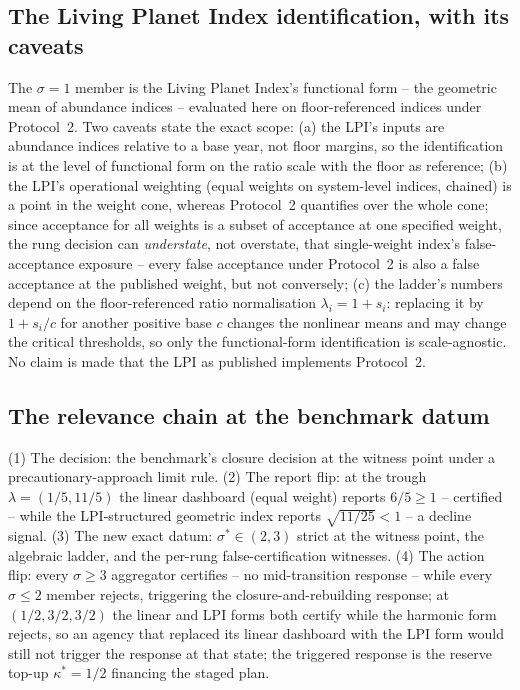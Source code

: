 \documentclass[preprint,11pt,authoryear]{elsarticle}
\theoremstyle{remark}
\begin{document}
\subsection{The Living Planet Index identification, with its caveats}

The $\sigma=1$ member is the Living Planet Index's functional form -- the geometric mean of abundance indices -- evaluated here on floor-referenced indices under Protocol~2. Two caveats state the exact scope: (a) the LPI's inputs are abundance indices relative to a base year, not floor margins, so the identification is at the level of functional form on the ratio scale with the floor as reference; (b) the LPI's operational weighting (equal weights on system-level indices, chained) is a point in the weight cone, whereas Protocol~2 quantifies over the whole cone; since acceptance for all weights is a subset of acceptance at one specified weight, the rung decision can \emph{understate}, not overstate, that single-weight index's false-acceptance exposure -- every false acceptance under Protocol~2 is also a false acceptance at the published weight, but not conversely; (c) the ladder's numbers depend on the floor-referenced ratio normalisation $\lambda_i=1+s_i$: replacing it by $1+s_i/c$ for another positive base $c$ changes the nonlinear means and may change the critical thresholds, so only the functional-form identification is scale-agnostic. No claim is made that the LPI as published implements Protocol~2.

\subsection{The relevance chain at the benchmark datum}

(1) The decision: the benchmark's closure decision at the witness point under a precautionary-approach limit rule. (2) The report flip: at the trough $\lambda=(1/5,11/5)$ the linear dashboard (equal weight) reports $6/5\ge1$ -- certified -- while the LPI-structured geometric index reports $\sqrt{11/25}<1$ -- a decline signal. (3) The new exact datum: $\sigma^*\in(2,3)$ strict at the witness point, the algebraic ladder, and the per-rung false-certification witnesses. (4) The action flip: every $\sigma\ge3$ aggregator certifies -- no mid-transition response -- while every $\sigma\le2$ member rejects, triggering the closure-and-rebuilding response; at $(1/2,3/2,3/2)$ the linear and LPI forms both certify while the harmonic form rejects, so an agency that replaced its linear dashboard with the LPI form would still not trigger the response at that state; the triggered response is the reserve top-up $\kappa^*=1/2$ financing the staged plan.
\end{document}

